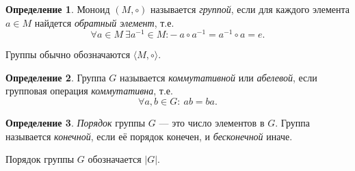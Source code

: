 \documentclass[a4paper, 14pt]{extarticle}
\newcommand{\n}{\par}
\newcommand{\suchthat}{{:}{-} \ }
\theoremstyle{definition}
\newtheorem{definition}{Определение}
\theoremstyle{plain}
\numberwithin{theorem}{section}
\numberwithin{definition}{section}
\numberwithin{statement}{section}
\numberwithin{lemma}{section}
\numberwithin{consequence}{section}
\begin{document}
		\begin{definition}
			Моноид $(M, \circ)$ называется \textit{группой}, если для каждого элемента $a \in M$ найдется \textit{обратный элемент}, т.е.
			\begin{equation*} 
			 \forall a \in M \ \exists a^{-1} \in M \suchthat a \circ a^{-1} = a^{-1} \circ a = e.
			\end{equation*} \n
			Группы обычно обозначаются $\langle M, \circ \rangle.$
		\end{definition}
		\begin{definition}
			Группа $G$ называется \textit{коммутативной} или \textit{абелевой}, если групповая операция \textit{коммутативна}, т.е.
			\begin{equation*}
				\forall a, b \in G{:} \ ab = ba.
			\end{equation*}
		\end{definition}
		\thispagestyle{empty}
		\begin{definition}
			\textit{Порядок} группы $G$ — это число элементов в $G$. Группа называется \textit{конечной}, если её порядок конечен, и \textit{бесконечной} иначе. \n
			Порядок группы $G$ обозначается $|G|$.
		\end{definition} 
		\newpage
\end{document}
